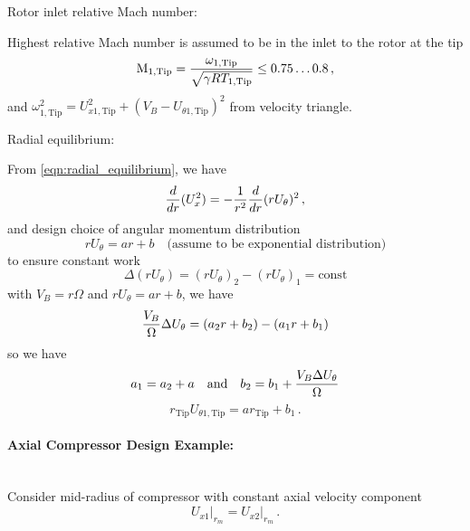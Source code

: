 \begin{enumeratePacked}
\begin{itemizePacked}
  \end{itemizePacked}
\item Rotor inlet relative Mach number:
  \begin{itemizePacked}
  \item Highest relative Mach number is assumed to be in the inlet to the rotor at the tip
    \[
      \text{M}_{1,\text{Tip}} = {\frac{\omega_{1,\text{Tip}}}{\sqrt{\gamma R T_{1,\text{Tip}}}}} \le 0.75 \dots 0.8\,,
    \]
    and $\omega_{1,\text{Tip}}^2 = U_{x1,\text{Tip}}^2 + (V_B - U_{\theta1,\text{Tip}})^2$ from velocity triangle.
  \end{itemizePacked}
\item Radial equilibrium:
  \begin{itemizePacked}
  \item From \cref{eqn:radial_equilibrium}, we have
    \[
      {\frac{d}{dr}} (U_x^2) = - {\frac{1}{r^2}} {\frac{d}{dr}} (r U_\theta)^2\,,
    \]
    and design choice of angular momentum distribution
    \[
      r U_\theta = a r + b \quad \text{(assume to be exponential distribution)}
    \]
    to ensure constant work
    \[
      \Delta (r U_\theta) = (r U_\theta)_2 - (r U_\theta)_1 = \text{const}
    \]
    with $V_B = r \Omega$ and $r U_\theta = a r + b$, we have
    \[
      {\frac{V_B}{\Omega}} \Delta U_\theta = (a_2 r + b_2) - (a_1 r + b_1)
    \]
    so we have
    \[
      a_1 = a_2 + a \quad \text{and} \quad b_2 = b_1 + {\frac{V_B \Delta U_\theta}{\Omega}}
    \]
    \[
      r_\text{Tip} U_{\theta1, \text{Tip}} = a r_\text{Tip} + b_1\,.
    \]
  \end{itemizePacked}
\end{enumeratePacked}

\paragraph{Axial Compressor Design Example:}  \mbox{}\\[0.5em]

Consider mid-radius of compressor with constant axial velocity component
\[
  \left.U_{x1}\right|_{r_m} = \left.U_{x2}\right|_{r_m}\,.
\]

